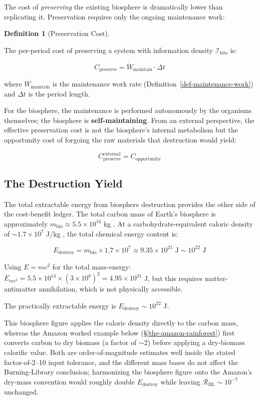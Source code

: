 \documentclass[11pt]{article}
\theoremstyle{plain}
\theoremstyle{definition}
\newtheorem{definition}{Definition}
\theoremstyle{remark}
\let\origsubsection\subsection
\renewcommand{\subsection}{\needspace{7\baselineskip}\origsubsection}
\begin{document}
The cost of \emph{preserving} the existing biosphere is dramatically
lower than replicating it. Preservation requires only the ongoing
maintenance work:

\begin{definition}[Preservation Cost]
\label{def-preservation-cost}

The per-period cost of preserving a system with information density $\mathcal{I}_{\text{bits}}$ is:

$$C_{\text{preserve}} = \dot{W}_{\text{maintain}} \cdot \Delta t$$

where $\dot{W}_{\text{maintain}}$ is the maintenance work rate (Definition~\ref{def-maintenance-work}) and $\Delta t$ is the period length.
\end{definition}

For the biosphere, the maintenance is performed autonomously by the
organisms themselves; the biosphere is \textbf{self-maintaining}. From
an external perspective, the effective preservation cost is not the
biosphere's internal metabolism but the opportunity cost of forgoing the
raw materials that destruction would yield:

\[C_{\text{preserve}}^{\text{external}} = C_{\text{opportunity}}\]

\subsection{The Destruction Yield}\label{the-destruction-yield}

The total extractable energy from biosphere destruction provides the
other side of the cost-benefit ledger. The total carbon mass of Earth's
biosphere is approximately \(m_{\text{bio}} \approx 5.5 \times 10^{14}\)
kg \citep{BarOn2018}. At a carbohydrate-equivalent caloric density of
\(\sim 1.7 \times 10^7\) J/kg \citep{Smil2002}, the total chemical
energy content is:

\[E_{\text{destroy}} = m_{\text{bio}} \times 1.7 \times 10^7 \approx 9.35 \times 10^{21} \text{ J} \sim 10^{22} \text{ J}\]

Using \(E = mc^2\) for the total mass-energy:
\(E_{mc^2} = 5.5 \times 10^{14} \times (3 \times 10^8)^2 = 4.95 \times 10^{31}\)
J, but this requires matter-antimatter annihilation, which is not
physically accessible.

The practically extractable energy is
\(E_{\text{destroy}} \sim 10^{22}\) J.

This biosphere figure applies the caloric density directly to the carbon
mass, whereas the Amazon worked example below
(§\ref{the-amazon-rainforest}) first converts carbon to dry biomass (a
factor of \(\sim 2\)) before applying a dry-biomass calorific value.
Both are order-of-magnitude estimates well inside the stated
factor-of-2--10 input tolerance, and the different mass bases do not
affect the Burning-Library conclusion; harmonizing the biosphere figure
onto the Amazon's dry-mass convention would roughly double
\(E_{\text{destroy}}\) while leaving
\(\mathcal{R}_{\text{BL}} \sim 10^{-7}\) unchanged.
\end{document}
